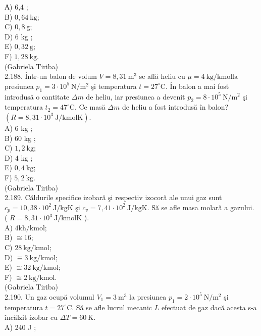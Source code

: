 \documentclass[10pt]{article}
\begin{document}
А) 6,4 ;\\
B) $0,64 \mathrm{~kg}$;\\
C) $0,8 \mathrm{~g}$;\\
D) 6 kg ;\\
E) $0,32 \mathrm{~g}$;\\
F) $1,28 \mathrm{~kg}$.\\
(Gabriela Tiriba)\\
2.188. Într-un balon de volum $V=8,31 \mathrm{~m}^{3}$ se află heliu cu $\mu=4 \mathrm{~kg} / \mathrm{kmol} \mathrm{la}$ presiunea $p_{1}=3 \cdot 10^{5} \mathrm{~N} / \mathrm{m}^{2}$ şi temperatura $t=27^{\circ} \mathrm{C}$. În balon a mai fost introdusă o cantitate $\Delta m$ de heliu, iar presiunea a devenit $p_{2}=8 \cdot 10^{5} \mathrm{~N} / \mathrm{m}^{2}$ şi temperatura $t_{2}=47^{\circ} \mathrm{C}$. Ce masă $\Delta m$ de heliu a fost introdusă în balon? $\left(R=8,31 \cdot 10^{3} \mathrm{~J} / \mathrm{kmol} \mathrm{K}\right)$.\\
A) 6 kg ;\\
B) 60 kg ;\\
C) $1,2 \mathrm{~kg}$;\\
D) 4 kg ;\\
E) $0,4 \mathrm{~kg}$;\\
F) $5,2 \mathrm{~kg}$.\\
(Gabriela Tiriba)\\
2.189. Căldurile specifice izobară şi respectiv izocoră ale unui gaz sunt $c_{p}=10,38 \cdot 10^{2} \mathrm{~J} / \mathrm{kgK}$ şi $c_{v}=7,41 \cdot 10^{2} \mathrm{~J} / \mathrm{kgK}$. Să se afle masa molară a gazului. ( $R=8,31 \cdot 10^{3} \mathrm{~J} / \mathrm{kmolK}$ ).\\
A) $4 \mathrm{kh} / \mathrm{kmol}$;\\
B) $\cong 16$;\\
C) $28 \mathrm{~kg} / \mathrm{kmol}$;\\
D) $\equiv 3 \mathrm{~kg} / \mathrm{kmol}$;\\
E) $\cong 32 \mathrm{~kg} / \mathrm{kmol}$;\\
F) $\cong 2 \mathrm{~kg} / \mathrm{kmol}$.\\
(Gabriela Tiriba)\\
2.190. Un gaz ocupă volumul $V_{1}=3 \mathrm{~m}^{3}$ la presiunea $p_{1}=2 \cdot 10^{5} \mathrm{~N} / \mathrm{m}^{2}$ şi temperatura $t=27^{\circ} \mathrm{C}$. Să se afle lucrul mecanic $L$ efectuat de gaz dacă acesta s-a încălzit izobar cu $\Delta T=60 \mathrm{~K}$.\\
A) 240 J ;\\
\end{document}
